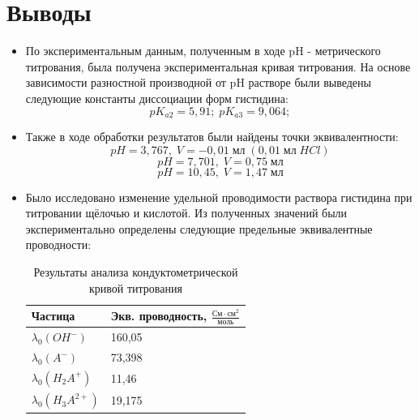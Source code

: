 \documentclass[a4paper, 11pt]{article}%
\begin{document}
    \section{Выводы}
    \begin{itemize}
        \item По экспериментальным данным, полученным в ходе pH - метрического титрования, была получена экспериментальная кривая титрования. На основе зависимости разностной производной от pH растворе были выведены следующие константы диссоциации форм гистидина:
        $$pK_{a2} = 5,91; \; pK_{a3} = 9,064;$$
        \item Также в ходе обработки результатов были найдены точки эквивалентности:
        $$pH = 3,767, \; V = -0,01 \; \text{мл} \; (0,01 \; \text{мл} \; HCl)$$
        $$pH = 7,701, \; V = 0,75 \; \text{мл}$$
        $$pH = 10,45, \; V = 1,47 \; \text{мл}$$
 
        \item Было исследовано изменение удельной проводимости раствора гистидина при титровании щёлочью и кислотой. Из полученных значений были экспериментально определены следующие предельные эквивалентные проводности:
        \begin{table}[h!]
    \centering
    \begin{tabular}{|l|l|}
    \hline
    Частица & Экв. проводность, $\frac{\text{См}\cdot\text{см}^{2}}{\text{моль}}$ \\ \hline
    $\lambda_{0}(OH^{-})$    & 160,05                \\ \hline
    $\lambda_{0}(A^{-})$    & 73,398                \\ \hline
    $\lambda_{0}(H_{2}A^{+})$    & 11,46                 \\ \hline
    $\lambda_{0}(H_{3}A^{2+})$    & 19,175                \\ \hline
\end{tabular}
\caption{Результаты анализа кондуктометрической кривой титрования}
\label{tab:my-table}
\end{table}
    \end{itemize}
\end{document}
